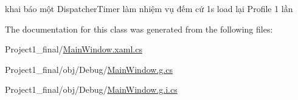 khai báo một Dispatcher\+Timer làm nhiệm vụ đếm cứ 1s load lại Profile 1 lần 



The documentation for this class was generated from the following files\+:\begin{DoxyCompactItemize}
\item 
Project1\+\_\+final/\hyperlink{_main_window_8xaml_8cs}{Main\+Window.\+xaml.\+cs}\item 
Project1\+\_\+final/obj/\+Debug/\hyperlink{_main_window_8g_8cs}{Main\+Window.\+g.\+cs}\item 
Project1\+\_\+final/obj/\+Debug/\hyperlink{_main_window_8g_8i_8cs}{Main\+Window.\+g.\+i.\+cs}\end{DoxyCompactItemize}
